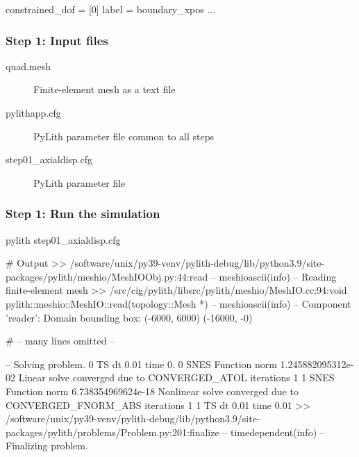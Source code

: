 \documentclass[aspectratio=169]{beamer}
\begin{document}
\begin{frame}[t,fragile]
\begin{minipage}[t]{0.60\textwidth}
\begin{onlyenv}
\begin{cfgcode}
        constrained_dof = [0]
        label = boundary_xpos
        ...
      \end{cfgcode}
    \end{onlyenv}
  \end{minipage}

    

  
\end{frame}


\begin{frame}
  \frametitle{Step 1: Input files}
  \summary{}

  \begin{description}
  \item[quad.mesh] Finite-element mesh as a text file
  \item[pylithapp.cfg] PyLith parameter file common to all steps
  \item[step01\_axialdisp.cfg] PyLith parameter file
  \end{description}
    
\end{frame}


\begin{frame}[fragile]
  \frametitle{Step 1: Run the simulation}
  \summary{}

\begin{bashcode}
pylith step01_axialdisp.cfg

# Output
 >> /software/unix/py39-venv/pylith-debug/lib/python3.9/site-packages/pylith/meshio/MeshIOObj.py:44:read
 -- meshioascii(info)
 -- Reading finite-element mesh
 >> /src/cig/pylith/libsrc/pylith/meshio/MeshIO.cc:94:void pylith::meshio::MeshIO::read(topology::Mesh *)
 -- meshioascii(info)
 -- Component 'reader': Domain bounding box:
    (-6000, 6000)
    (-16000, -0)

# -- many lines omitted --

 -- Solving problem.
0 TS dt 0.01 time 0.
    0 SNES Function norm 1.245882095312e-02 
    Linear solve converged due to CONVERGED_ATOL iterations 1
    1 SNES Function norm 6.738354969624e-18 
  Nonlinear solve converged due to CONVERGED_FNORM_ABS iterations 1
1 TS dt 0.01 time 0.01
 >> /software/unix/py39-venv/pylith-debug/lib/python3.9/site-packages/pylith/problems/Problem.py:201:finalize
 -- timedependent(info)
 -- Finalizing problem.
\end{bashcode}
  
\end{frame}
\end{document}
